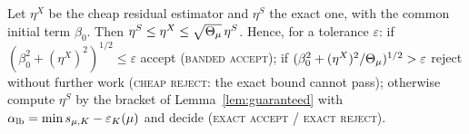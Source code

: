 \begin{proposition}\label{prop:twostage}
Let $\eta^X$ be the cheap residual estimator and $\eta^S$ the exact one, with the common
initial term $\beta_0$.  Then
$\eta^S\le\eta^X\le\sqrt{\Theta_\mu}\,\eta^S$.  Hence, for a tolerance $\varepsilon$:
if $(\beta_0^2+(\eta^X)^2)^{1/2}\le\varepsilon$ accept (\textsc{banded accept});
if $(\beta_0^2+(\eta^X)^2/\Theta_\mu)^{1/2}>\varepsilon$ reject without further work
(\textsc{cheap reject}: the exact bound cannot pass);
otherwise compute $\eta^S$ by the bracket of Lemma~\ref{lem:guaranteed} with
$\alpha_{\rm lb}=\min s_{\mu,K}-\varepsilon_K(\mu)$ and decide
(\textsc{exact accept} / \textsc{exact reject}).
\end{proposition}
